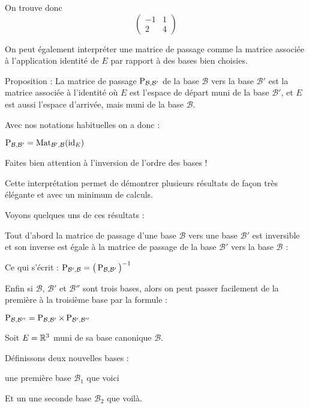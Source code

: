 On trouve donc 
$$\begin{pmatrix}-1&1\\2&4\end{pmatrix}$$

\diapo


On peut également interpréter une matrice de passage comme la matrice associée à
l'application identité de $E$ par rapport à des bases bien choisies.

Proposition : 
La matrice de passage $\mathop{\text{P}}\nolimits_{\mathcal{B},\mathcal{B}'}$
de la base $\mathcal{B}$ vers la base $\mathcal{B}'$
est la matrice associée à l'identité 
où $E$ est l'espace de départ muni de la base $\mathcal{B}'$,
et $E$ est aussi l'espace d'arrivée, mais muni de la base $\mathcal{B}$.

Avec nos notations habituelles on a donc :

$\mathop{\text{P}}\nolimits_{\mathcal{B},\mathcal{B'}} = \mathop{\mathrm{Mat}}\nolimits_{\mathcal{B}',\mathcal{B}} (\mathop{\text{id}}\nolimits_E)$

Faites bien attention à l'inversion de l'ordre des bases !


Cette interprétation permet de démontrer plusieurs résultats de façon très élégante et avec un
minimum de calculs. 

\change
Voyons quelques uns de ces résultats :


Tout d'abord la matrice de passage d'une base $\mathcal{B}$ vers une base $\mathcal{B}'$ 
  est inversible et son inverse est égale à la matrice de passage de la base $\mathcal{B}'$ 
  vers la base $\mathcal{B}$ : 
  
Ce qui s'écrit : $\mathop{\text{P}}\nolimits_{\mathcal{B}',\mathcal{B}} = \big( \mathop{\text{P}}\nolimits_{\mathcal{B},\mathcal{B}'} \big)^{-1}$
  

\change
Enfin si $\mathcal{B}$, $\mathcal{B}'$ et $\mathcal{B}''$ sont trois bases, alors
on peut passer facilement de la première à la troisième base par la formule :

$\mathop{\text{P}}\nolimits_{\mathcal{B},\mathcal{B}''} = \mathop{\text{P}}\nolimits_{\mathcal{B},\mathcal{B}'}
  \times \mathop{\text{P}}\nolimits_{\mathcal{B}',\mathcal{B}''}$


\diapo


Soit $E = \mathbb{R}^3$ muni de sa base canonique $\mathcal{B}$. 

\change
Définissons deux nouvelles bases :

une première base $\mathcal{B}_1$
que voici

\change
Et un une seconde base $\mathcal{B}_2$
que voilà.

